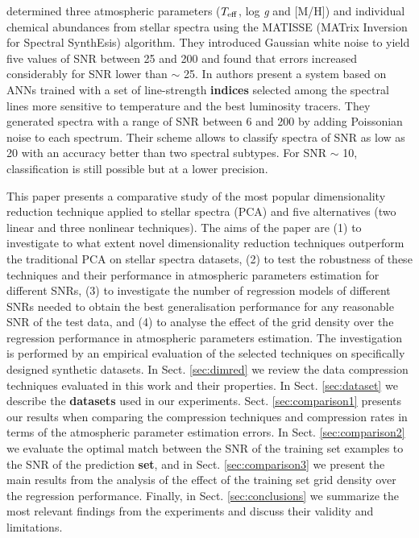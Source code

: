 \documentclass[a4paper,fleqn,usenatbib]{mnras}
\begin{document}
\cite{recio:06} determined three atmospheric parameters
($T_{\rm eff}$, log \textit{g} and [M/H]) and individual chemical
abundances from stellar spectra using the MATISSE (MATrix
Inversion for Spectral SynthEsis) algorithm. They introduced Gaussian
white noise to yield five values of SNR between 25 and 200 and found
that errors increased considerably for SNR lower than $\sim$ 25.  In
\cite{navarro:12} authors present a system based on ANNs trained with
a set of line-strength {\bf indices} selected among the spectral lines more
sensitive to temperature and the best luminosity tracers. They
generated spectra with a range of SNR between 6 and 200 by adding
Poissonian noise to each spectrum. Their scheme allows to classify
spectra of SNR as low as 20 with an accuracy better than two spectral
subtypes. For SNR $\sim$ 10, classification is still possible but at a
lower precision.

This paper presents a comparative study of the most popular
dimensionality reduction technique applied to stellar spectra (PCA)
and five alternatives (two linear and three nonlinear techniques). The
aims of the paper are (1) to investigate to what extent novel
dimensionality reduction techniques outperform the traditional PCA on
stellar spectra datasets, (2) to test the robustness of these
techniques and their performance in atmospheric parameters estimation
for different SNRs, (3) to investigate the number of regression models
of different SNRs needed to obtain the best generalisation performance
for any reasonable SNR of the test data, and (4) to analyse the effect
of the grid density over the regression performance in atmospheric
parameters estimation.  The investigation is performed by an empirical
evaluation of the selected techniques on specifically designed
synthetic datasets. In Sect. \ref{sec:dimred} we review the data compression
techniques evaluated in this work and their properties. In
Sect. \ref{sec:dataset} we describe the {\bf datasets} used in our experiments. 
Sect. \ref{sec:comparison1} presents our results when comparing the 
compression techniques and compression rates in terms of the atmospheric 
parameter estimation errors. In Sect. \ref{sec:comparison2} we evaluate 
the optimal match between the SNR of the training set examples to the SNR 
of the prediction {\bf set}, and in Sect. \ref{sec:comparison3} we present 
the main results from the analysis of the effect of the training set grid 
density over the regression performance. Finally, in Sect. 
\ref{sec:conclusions} we summarize the most relevant findings from 
the experiments and discuss their validity and limitations.
\end{document}
